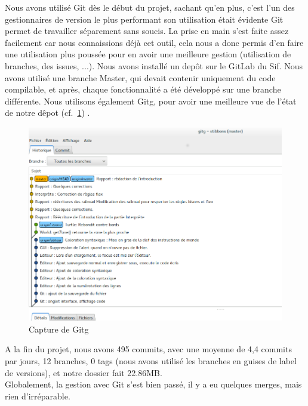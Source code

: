 Nous avons utilisé Git dès le début du projet, sachant qu'en plus, c'est l'un des gestionnaires de version le plus performant son utilisation était évidente
Git permet de travailler séparement sans soucis. La prise en main s'est faite assez facilement car nous connaissions déjà cet outil, cela nous a donc permis d'en faire une utilisation plus poussée pour en avoir une meilleure gestion (utilisation de branches, des issues, ...).
Nous avons installé un depôt sur le GitLab du Sif. Nous avons utilisé une branche Master, qui devait contenir uniquement du code compilable, et après, chaque fonctionnalité a été développé sur une branche différente.
Nous utilisons également Gitg, pour avoir une meilleure vue de l'état de notre dêpot (cf.~\ref{Gitg}) .
\begin{figure}[h]
\caption{\label{Gitg} Capture de Gitg}
\includegraphics[scale=0.35]{doc/gestionProjet/gitbranche.png}
\end{figure}
A la fin du projet, nous avons 495 commits, avec une moyenne de 4,4 commits par jours, 12 branches, 0 tags (nous avons utilisé les branches en guises de label de versions), et notre dossier fait 22.86MB.\\
Globalement, la gestion avec Git s'est bien passé, il y a eu quelques merges, mais rien d'irréparable. 

